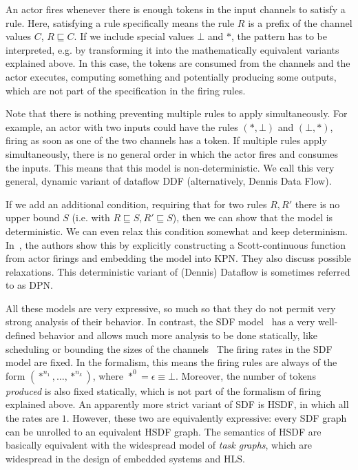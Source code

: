 An actor fires whenever there is enough tokens in the input channels to satisfy a rule.
Here, satisfying a rule specifically means the rule $R$ is a prefix of the channel values $C$, $R \sqsubseteq C$.
If we include special values $\bot$ and $*$, the pattern has to be interpreted, e.g. by transforming it into the mathematically equivalent variants explained above.
In this case, the tokens are consumed from the channels and the actor executes, computing something and potentially producing some outputs, which are not part of the specification in the firing rules.

Note that there is nothing preventing multiple rules to apply simultaneously. For example, an actor with two inputs could have the rules $(*,\bot)$ and $(\bot,*)$, firing as soon as one of the two channels has a token.
If multiple rules apply simultaneously, there is no general order in which the actor fires and consumes the inputs. 
This means that this model is non-deterministic.
We call this very general, dynamic variant of dataflow \ac{DDF} (alternatively, Dennis Data Flow).

If we add an additional condition, requiring that for two rules $R,R'$ there is no upper bound $S$ (i.e. with $R \sqsubseteq S, R' \sqsubseteq S$), then we can show that the model is deterministic.
We can even relax this condition somewhat and keep determinism. In~\cite{lee_matsikoudis_semantics}, the authors show this by explicitly constructing a Scott-continuous function from actor firings and embedding the model into \ac{KPN}.
They also discuss possible relaxations.
This deterministic variant of (Dennis) Dataflow is sometimes referred to as \ac{DPN}.

All these models are very expressive, so much so that they do not permit very strong analysis of their behavior.
In contrast, the \ac{SDF} model~\cite{lee1987sdf} has a very well-defined behavior and allows much more analysis to be done statically, like scheduling or bounding the sizes of the channels~\cite{Parks:M95/105}
The firing rates in the \ac{SDF} model are fixed. In the formalism, this means the firing rules are always of the form $(*^{n_1},\ldots,*^{n_k})$, where $*^0 = \epsilon \equiv \bot$.
Moreover, the number of tokens \emph{produced} is also fixed statically, which is not part of the formalism of firing explained above. 
An apparently more strict variant of \ac{SDF} is \ac{HSDF}, in which all the rates are $1$. However, these two are equivalently expressive: every \ac{SDF} graph can be unrolled to an equivalent \ac{HSDF} graph.
The semantics of \ac{HSDF} are basically equivalent with the widespread model of \emph{task graphs}, which are widespread in the design of embedded systems and \ac{HLS}.


